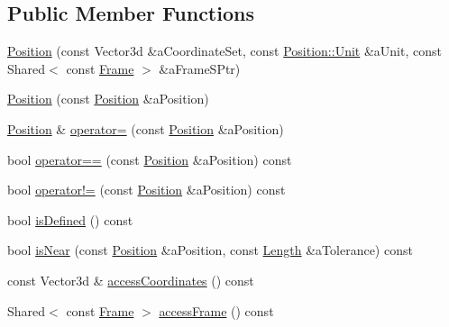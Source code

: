 \subsection*{Public Member Functions}
\begin{DoxyCompactItemize}
\item 
\hyperlink{classostk_1_1physics_1_1coord_1_1_position_a395cdb1415e49ae38dfef883fcc397d7}{Position} (const Vector3d \&a\+Coordinate\+Set, const \hyperlink{classostk_1_1physics_1_1units_1_1_length_a2664470a7eedf5d45c88861fe69badea}{Position\+::\+Unit} \&a\+Unit, const Shared$<$ const \hyperlink{classostk_1_1physics_1_1coord_1_1_frame}{Frame} $>$ \&a\+Frame\+S\+Ptr)
\item 
\hyperlink{classostk_1_1physics_1_1coord_1_1_position_a3de0cc8c3a8478760298fa63f1c23e5f}{Position} (const \hyperlink{classostk_1_1physics_1_1coord_1_1_position}{Position} \&a\+Position)
\item 
\hyperlink{classostk_1_1physics_1_1coord_1_1_position}{Position} \& \hyperlink{classostk_1_1physics_1_1coord_1_1_position_a8479aecc508b17a092dd606242bd271b}{operator=} (const \hyperlink{classostk_1_1physics_1_1coord_1_1_position}{Position} \&a\+Position)
\item 
bool \hyperlink{classostk_1_1physics_1_1coord_1_1_position_a5384658411f001cf57747382ab4fd461}{operator==} (const \hyperlink{classostk_1_1physics_1_1coord_1_1_position}{Position} \&a\+Position) const
\item 
bool \hyperlink{classostk_1_1physics_1_1coord_1_1_position_af1c3aef299ac63eac53a4b0fbffbc6fb}{operator!=} (const \hyperlink{classostk_1_1physics_1_1coord_1_1_position}{Position} \&a\+Position) const
\item 
bool \hyperlink{classostk_1_1physics_1_1coord_1_1_position_a969585edcf7795bbb6f4e62a10b2885b}{is\+Defined} () const
\item 
bool \hyperlink{classostk_1_1physics_1_1coord_1_1_position_a74cd31785d720561076b9f277d008dae}{is\+Near} (const \hyperlink{classostk_1_1physics_1_1coord_1_1_position}{Position} \&a\+Position, const \hyperlink{classostk_1_1physics_1_1units_1_1_length}{Length} \&a\+Tolerance) const
\item 
const Vector3d \& \hyperlink{classostk_1_1physics_1_1coord_1_1_position_a47594258eb1f13649f3ba705a9a3d1e8}{access\+Coordinates} () const
\item 
Shared$<$ const \hyperlink{classostk_1_1physics_1_1coord_1_1_frame}{Frame} $>$ \hyperlink{classostk_1_1physics_1_1coord_1_1_position_a6d0b16ecc3e6d5f4f186985103b61fdb}{access\+Frame} () const

\end{DoxyCompactItemize}
